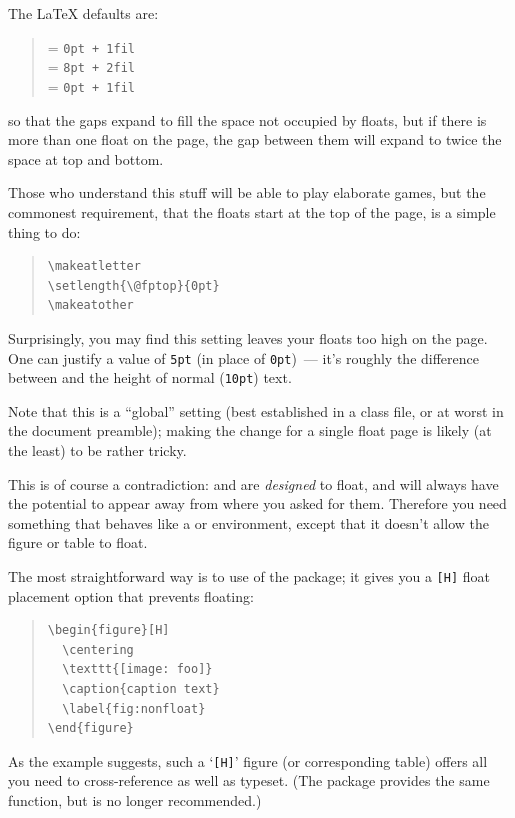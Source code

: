The \LaTeX{} defaults are:
\begin{quote}
   = \texttt{0pt + 1fil}\\
   = \texttt{8pt + 2fil}\\
   = \texttt{0pt + 1fil}\\
\end{quote}
so that the gaps expand to fill the space not occupied by floats, but
if there is more than one float on the page, the gap between them will
expand to twice the space at top and bottom.

Those who understand this stuff will be able to play elaborate games,
but the commonest requirement, that the floats start at the top of the
page, is a simple thing to do:
\begin{quote}
\begin{verbatim}
\makeatletter
\setlength{\@fptop}{0pt}
\makeatother
\end{verbatim}
\end{quote}
Surprisingly, you may find this setting leaves your floats too high on
the page.  One can justify a value of \texttt{5pt} (in place of
\texttt{0pt})~--- it's roughly the difference between 
and the height of normal (\texttt{10pt}) text.

Note that this is a ``global'' setting (best established in a class
file, or at worst in the document preamble); making the change for a
single float page is likely (at the least) to be rather tricky.


This is of course a contradiction:  and
 are \emph{designed} to float, and will always have
the potential to appear away from where you asked for them.  Therefore
you need something that behaves like a  or
 environment, except that it doesn't allow the
figure or table to float.

The most straightforward way is to use of the  package;
it gives you a \texttt{[H]} float placement option that prevents
floating:
\begin{quote}
\begin{verbatim}
\begin{figure}[H]
  \centering
  \texttt{[image: foo]}
  \caption{caption text}
  \label{fig:nonfloat}
\end{figure}
\end{verbatim}
\end{quote}
As the example suggests, such a `\texttt{[H]}' figure (or
corresponding table) offers all you need to cross-reference as well
as typeset.  (The package  provides the same function,
but is no longer recommended.)

